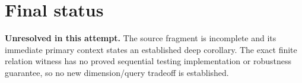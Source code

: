 \documentclass[11pt]{article}
\begin{document}
\section{Final status}
\textbf{Unresolved in this attempt.} The source fragment is incomplete and its immediate primary context states an established deep corollary. The exact finite relation witness has no proved sequential testing implementation or robustness guarantee, so no new dimension/query tradeoff is established.
\end{document}
